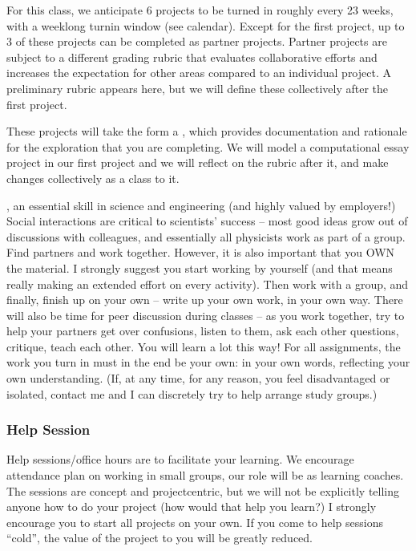 \documentclass[letterpaper,10pt,english]{jupyterBook}
\begin{document}
\sphinxAtStartPar
{} For this class, we anticipate 6 projects to be turned in roughly every 2\sphinxhyphen{}3 weeks, with a weeklong turn\sphinxhyphen{}in window (see calendar). Except for the first project, up to 3 of these projects can be completed as partner projects. Partner projects are subject to a different grading rubric that evaluates collaborative efforts and increases the expectation for other areas compared to an individual project. A preliminary rubric appears here, but we will define these collectively after the first project.

\sphinxAtStartPar
These projects will take the form a , which provides documentation and rationale for the exploration that you are completing. We will model a computational essay project in our first project and we will reflect on the rubric after it, and make changes collectively as a class to it.

\sphinxAtStartPar
{}, an essential skill in science and engineering (and highly valued by employers!) Social interactions are critical to scientists’ success – most good ideas grow out of discussions with colleagues, and essentially all physicists work as part of a group. Find partners and work together. However, it is also important that you OWN the material. I strongly suggest you start working by yourself (and that means really making an extended effort on every activity). Then work with a group, and finally, finish up on your own – write up your own work, in your own way. There will also be time for peer discussion during classes – as you work together, try to help your partners get over confusions, listen to them, ask each other questions, critique, teach each other. You will learn a lot this way! For all assignments, the work you turn in must in the end be your own: in your own words, reflecting your own understanding. (If, at any time, for any reason, you feel disadvantaged or isolated, contact me and I can discretely try to help arrange study groups.)


\subsubsection{Help Session}
\label{\detokenize{content/0_course/design:help-session}}
\sphinxAtStartPar
Help sessions/office hours are to facilitate your learning. We encourage attendance \sphinxhyphen{} plan on working in small groups, our role will be as learning coaches. The sessions are concept and project\sphinxhyphen{}centric, but we will not be explicitly telling anyone how to do your project (how would that help you learn?) I strongly encourage you to start all projects on your own. If you come to help sessions “cold”, the value of the project to you will be greatly reduced.
\end{document}
